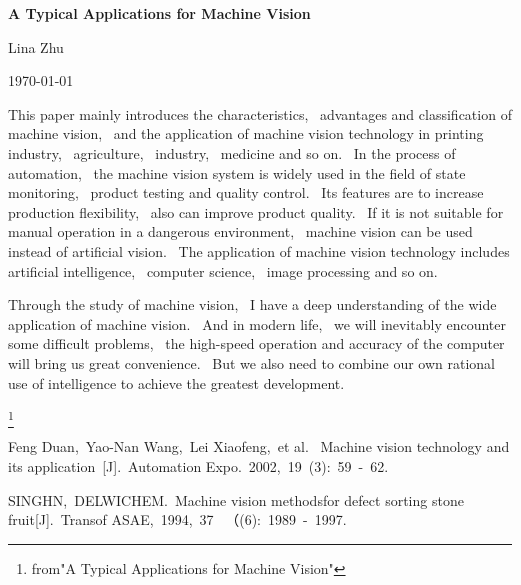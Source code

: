 \documentclass{article}
\begin{document}
	\begin{center}
	
		 {\bfseries \LARGE A Typical Applications for Machine Vision} 
		  
	\end{center}
	\begin{center}
		Lina Zhu
	\end{center}
	\begin{center}
		\today
	\end{center}
	
	\par This paper mainly introduces the characteristics, ~advantages and classification of machine vision,~ 
	and the application of machine vision technology in printing industry,~ agriculture,~ industry, ~medicine 
	and so on. ~In the process of automation,~ the machine vision system is widely used in the field of state
	 monitoring,~ product testing and quality control.~ Its features are to increase production flexibility,~
	  also can improve product quality.~ If it is not suitable for manual operation in a dangerous environment,~
	   machine vision can be used instead of artificial vision.~ The application of machine vision technology
	    includes artificial intelligence, ~computer science,~ image processing and so on.
	\par Through the study of machine vision,~ I have a deep understanding of the wide application of machine 
	vision.~ And in modern life,~ we will inevitably encounter some difficult problems,~ the high-speed operation 
	and accuracy of the computer will bring us great convenience.~ But we also need to combine our own rational
	 use of intelligence to achieve the greatest development.
	
	\footnote{from"A Typical Applications for Machine Vision"} 
	
	
	
	  
	   
	      
	\begin{thebibliography}{99}
		   Feng Duan,~Yao-Nan Wang,~Lei Xiaofeng,~et al.~ 
		Machine vision technology and its application~[J].~Automation Expo.~2002,~19~(3):~59~-~62.

	   SINGHN,~DELWICHEM.~Machine vision methodsfor defect sorting stone fruit[J].~Transof ASAE,~1994,~37 ~（(6):~1989~-~1997.
\end{thebibliography}
\end{document}
